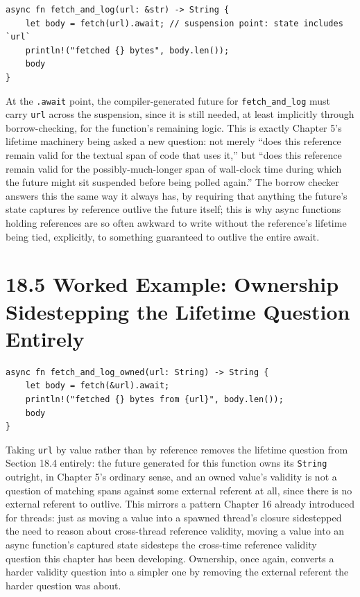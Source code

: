 \documentclass[11pt]{book}
\begin{document}
\begin{lstlisting}
async fn fetch_and_log(url: &str) -> String {
    let body = fetch(url).await; // suspension point: state includes `url`
    println!("fetched {} bytes", body.len());
    body
}
\end{lstlisting}

At the \texttt{.await} point, the compiler-generated future for \texttt{fetch\_and\_log} must carry \texttt{url} across the suspension, since it is still needed, at least implicitly through borrow-checking, for the function's remaining logic. This is exactly Chapter 5's lifetime machinery being asked a new question: not merely ``does this reference remain valid for the textual span of code that uses it,'' but ``does this reference remain valid for the possibly-much-longer span of wall-clock time during which the future might sit suspended before being polled again.'' The borrow checker answers this the same way it always has, by requiring that anything the future's state captures by reference outlive the future itself; this is why async functions holding references are so often awkward to write without the reference's lifetime being tied, explicitly, to something guaranteed to outlive the entire await.

\section*{18.5 Worked Example: Ownership Sidestepping the Lifetime Question Entirely}

\begin{lstlisting}
async fn fetch_and_log_owned(url: String) -> String {
    let body = fetch(&url).await;
    println!("fetched {} bytes from {url}", body.len());
    body
}
\end{lstlisting}

Taking \texttt{url} by value rather than by reference removes the lifetime question from Section 18.4 entirely: the future generated for this function owns its \texttt{String} outright, in Chapter 5's ordinary sense, and an owned value's validity is not a question of matching spans against some external referent at all, since there is no external referent to outlive. This mirrors a pattern Chapter 16 already introduced for threads: just as moving a value into a spawned thread's closure sidestepped the need to reason about cross-thread reference validity, moving a value into an async function's captured state sidesteps the cross-time reference validity question this chapter has been developing. Ownership, once again, converts a harder validity question into a simpler one by removing the external referent the harder question was about.
\end{document}
